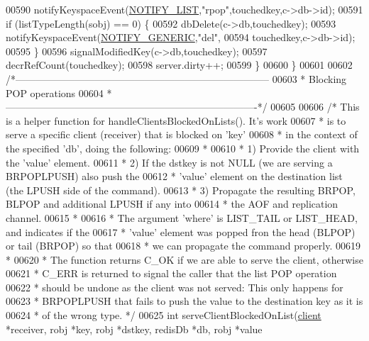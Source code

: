 \begin{DoxyCode}
00590         notifyKeyspaceEvent(\hyperlink{server_8h_a1c0b64c84b0e66dff3554ffe3e2ec4c8}{NOTIFY\_LIST},\textcolor{stringliteral}{"rpop"},touchedkey,c->db->id);
00591         \textcolor{keywordflow}{if} (listTypeLength(sobj) == 0) \{
00592             dbDelete(c->db,touchedkey);
00593             notifyKeyspaceEvent(\hyperlink{server_8h_a9fa53dd1068e62365f3964ad3479eec2}{NOTIFY\_GENERIC},\textcolor{stringliteral}{"del"},
00594                                 touchedkey,c->db->id);
00595         \}
00596         signalModifiedKey(c->db,touchedkey);
00597         decrRefCount(touchedkey);
00598         server.dirty++;
00599     \}
00600 \}
00601 
00602 \textcolor{comment}{/*-----------------------------------------------------------------------------}
00603 \textcolor{comment}{ * Blocking POP operations}
00604 \textcolor{comment}{ *----------------------------------------------------------------------------*/}
00605 
00606 \textcolor{comment}{/* This is a helper function for handleClientsBlockedOnLists(). It's work}
00607 \textcolor{comment}{ * is to serve a specific client (receiver) that is blocked on 'key'}
00608 \textcolor{comment}{ * in the context of the specified 'db', doing the following:}
00609 \textcolor{comment}{ *}
00610 \textcolor{comment}{ * 1) Provide the client with the 'value' element.}
00611 \textcolor{comment}{ * 2) If the dstkey is not NULL (we are serving a BRPOPLPUSH) also push the}
00612 \textcolor{comment}{ *    'value' element on the destination list (the LPUSH side of the command).}
00613 \textcolor{comment}{ * 3) Propagate the resulting BRPOP, BLPOP and additional LPUSH if any into}
00614 \textcolor{comment}{ *    the AOF and replication channel.}
00615 \textcolor{comment}{ *}
00616 \textcolor{comment}{ * The argument 'where' is LIST\_TAIL or LIST\_HEAD, and indicates if the}
00617 \textcolor{comment}{ * 'value' element was popped fron the head (BLPOP) or tail (BRPOP) so that}
00618 \textcolor{comment}{ * we can propagate the command properly.}
00619 \textcolor{comment}{ *}
00620 \textcolor{comment}{ * The function returns C\_OK if we are able to serve the client, otherwise}
00621 \textcolor{comment}{ * C\_ERR is returned to signal the caller that the list POP operation}
00622 \textcolor{comment}{ * should be undone as the client was not served: This only happens for}
00623 \textcolor{comment}{ * BRPOPLPUSH that fails to push the value to the destination key as it is}
00624 \textcolor{comment}{ * of the wrong type. */}
00625 \textcolor{keywordtype}{int} serveClientBlockedOnList(\hyperlink{structclient}{client} *receiver, robj *key, robj *dstkey, redisDb *db, robj *value

\end{DoxyCode}
